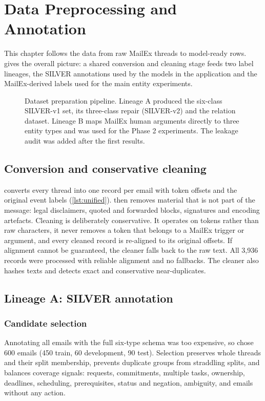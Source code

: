 \chapter{Data Preprocessing and Annotation}
\label{ch:preprocessing}

This chapter follows the data from raw MailEx threads to model-ready rows.  gives the overall picture: a shared conversion and cleaning stage feeds two label lineages, the SILVER annotations used by the models in the application and the MailEx-derived labels used for the main entity experiments.

\begin{figure}[t]
\centering
{}
\caption[Dataset preparation pipeline]{Dataset preparation pipeline. Lineage A produced the six-class SILVER-v1 set, its three-class repair (SILVER-v2) and the relation dataset. Lineage B maps MailEx human arguments directly to three entity types and was used for the Phase 2 experiments. The leakage audit was added after the first results.}
\label{fig:datapipeline}
\end{figure}

\section{Conversion and conservative cleaning}
 converts every thread into one record per email with token offsets and the original event labels (\cref{lst:unified}).  then removes material that is not part of the message: legal disclaimers, quoted and forwarded blocks, signatures and encoding artefacts. Cleaning is deliberately conservative. It operates on tokens rather than raw characters, it never removes a token that belongs to a MailEx trigger or argument, and every cleaned record is re-aligned to its original offsets. If alignment cannot be guaranteed, the cleaner falls back to the raw text. All 3,936 records were processed with reliable alignment and no fallbacks. The cleaner also hashes texts and detects exact and conservative near-duplicates.

\section{Lineage A: SILVER annotation}
\subsection{Candidate selection}
Annotating all emails with the full six-type schema was too expensive, so  chose 600 emails (450 train, 60 development, 90 test). Selection preserves whole threads and their split membership, prevents duplicate groups from straddling splits, and balances coverage signals: requests, commitments, multiple tasks, ownership, deadlines, scheduling, prerequisites, status and negation, ambiguity, and emails without any action.

